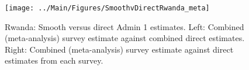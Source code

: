 \documentclass[12pt]{article}\usepackage[]{graphicx}\usepackage[]{color}
\newenvironment{knitrout}{}{} %
\begin{document}

\begin{knitrout}
\color{fgcolor}\begin{figure}[bht]

{\centering \texttt{[image: ../Main/Figures/SmoothvDirectRwanda\_meta]} 

}

\caption[Rwanda]{Rwanda: Smooth versus direct Admin 1 estimates. Left: Combined (meta-analysis) survey estimate against combined direct estimates. Right: Combined (meta-analysis) survey estimate against direct estimates from each survey.}\label{fig:unnamed-chunk-273}
\end{figure}


\end{knitrout}
\end{document}
